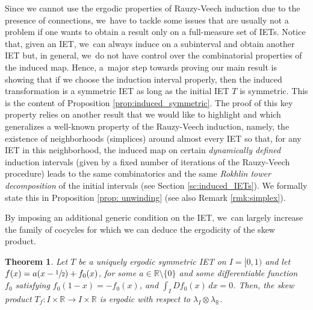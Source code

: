 \documentclass[JEP,XML,SOM,Unicode,NoEqCountersInSection,NoFloatCountersInSection,published]{cedram}
\theoremstyle{plain}
\newtheorem{theorem}{Theorem}[section]
\theoremstyle{definition}
\newcommand{\R}{\mathbb{R}}
\begin{document}
Since we cannot use the ergodic properties of Rauzy-Veech induction due to the
presence of connections, we~have to tackle some issues that are usually not a
problem if one wants to obtain a result only on a full-measure set of IETs.
Notice that, given an IET, we~can always induce on a subinterval and obtain
another IET but, in general, we~do not have control over the combinatorial
properties of the induced map. Hence, a~major step towards proving our main
result is showing that if we choose the induction interval properly, then the
induced transformation is a symmetric IET as long as the initial IET $T$ is
symmetric. This is the content of Proposition \ref{prop:induced_symmetric}. The
proof of this key property relies on another result that we would like to
highlight and which generalizes a well-known property of the Rauzy-Veech
induction, namely, the existence of neighborhoods (simplices) around almost
every IET so that, for any IET in this neighborhood, the induced map on certain
\emph{dynamically defined} induction intervals (given by a fixed number of
iterations of the Rauzy-Veech procedure) leads to the same combinatorics and
the same \emph{Rokhlin tower decomposition} of the initial intervals (see
Section \ref{sc:induced_IETs}). We formally state this in Proposition
\ref{prop: unwinding} (see also Remark \ref{rmk:simplex}).

By imposing an additional generic condition on the IET, we~can largely increase the family of cocycles for which we can deduce the ergodicity of the skew product.

\begin{theorem}\label{thm: uniqergo}
Let $T$ be a uniquely ergodic symmetric IET on $I = [0, 1)$ and let $f(x)=a(x-\sfrac{1}{2})+f_0(x)$, for some $a\in\R\setminus\{0\}$ and some differentiable function~$f_0$ satisfying $f_0(1-x)=-f_0(x)$, and $\int_I Df_0(x)\, dx=0$. Then, the skew product $T_f:I\times\R\to I\times \R$ is ergodic with respect to $\lambda_I\otimes\lambda_{\R}$.
\end{theorem}
\end{document}
